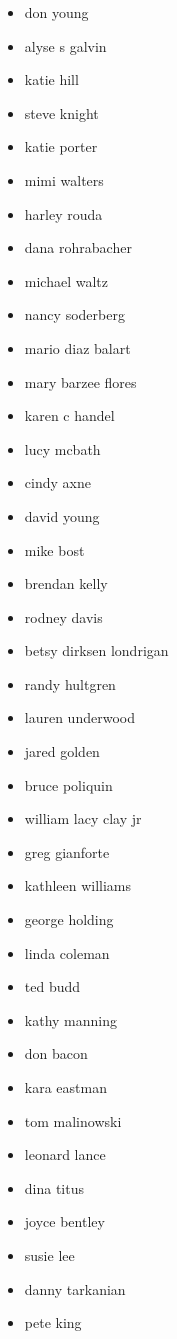 \documentclass[letterpaper]{article}
\begin{document}
\begin{itemize}
    \item don young
    \item alyse s galvin
    \item katie hill
    \item steve knight
    \item katie porter
    \item mimi walters
    \item harley rouda
    \item dana rohrabacher
    \item michael waltz
    \item nancy soderberg
    \item mario diaz balart
    \item mary barzee flores
    \item karen c handel
    \item lucy mcbath
    \item cindy axne
    \item david young
    \item mike bost
    \item brendan kelly
    \item rodney davis
    \item betsy dirksen londrigan
    \item randy hultgren
    \item lauren underwood
    \item jared golden
    \item bruce poliquin
    \item william lacy clay jr
    \item greg gianforte
    \item kathleen williams
    \item george holding
    \item linda coleman
    \item ted budd
    \item kathy manning
    \item don bacon
    \item kara eastman
    \item tom malinowski
    \item leonard lance
    \item dina titus
    \item joyce bentley
    \item susie lee
    \item danny tarkanian
    \item pete king

\end{itemize}
\end{document}
